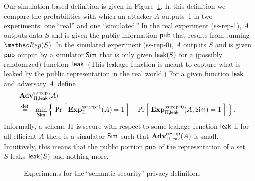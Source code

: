 Our simulation-based definition is given in
Figure~\ref{fig:privacy-ss}.
In this definition we compare the probabilities with which an attacker $A$ outputs~1
in two experiments: one ``real'' and one ``simulated.''
In the real experiment (ss-rep-1), $A$ outputs data $S$  and is given the
public information ${\sf pub}$ that results from running $\Rep(S)$.
In the simulated experiment (ss-rep-0), $A$ outputs $S$ and is given ${\sf pub}$ output
by a simulator ${\sf Sim}$ that is only given ${\sf leak}(S)$ for a (possibly randomized)
function~${\sf leak}$. (This leakage function is meant to capture what is leaked
by the public representation in the real world.)
For a given function ${\sf leak}$ and adversary $A$,
define
\begin{eqnarray*}
\lefteqn{\AdvPrivSS{\setprim,{\sf leak}}{A}} \\
& \bydef & \min_{\Sim} \left\{
\left| \Prob{\ExpPrivSSreal{\setprim}{A}=1} -
\Prob{\ExpPrivSSsim{\setprim,{\sf leak}}{A, \Sim}=1} \right|\right\}.\end{eqnarray*}
Informally, a scheme $\Pi$ is secure with respect to some leakage function ${\sf leak}$
if for all efficient $A$ there is a simulator ${\sf Sim}$ such that
$\mathrm{\mathbf{Adv}}^{\mathrm{ss\mbox{-}rep}}_{\Pi,{\sf leak}}(A)$ is small.
Intuitively, this means that the public portion
${\sf pub}$ of the representation of a set~$S$ leaks~${\sf leak}(S)$ and nothing more.

\begin{figure}[tb]
\centering
{}
\caption{Experiments for the ``semantic-security'' privacy
  definition.}
\label{fig:privacy-ss}
\end{figure}



